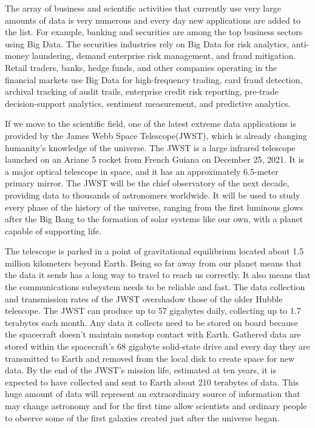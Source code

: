 The array of business and scientific activities that currently use very large amounts of data is very numerous and every day new applications are added to the list. For example, banking and securities are among the top business sectors using Big Data. The securities industries rely on Big Data for risk analytics, anti-money laundering, demand enterprise risk management, and fraud mitigation. Retail traders, banks, hedge funds, and other companies operating in the financial markets use Big Data for high-frequency trading, card fraud detection, archival tracking of audit trails, enterprise credit risk reporting, pre-trade decision-support analytics, sentiment measurement, and predictive analytics.

If we move to the scientific field, one of the latest extreme data applications is provided by the James Webb Space Telescope(JWST), which is already changing humanity's knowledge of the universe. The JWST is a large infrared telescope launched on an Ariane 5 rocket from French Guiana on December 25, 2021. It is a major optical telescope in space, and it has an approximately 6.5-meter primary mirror. The JWST will be the chief observatory of the next decade, providing data to thousands of astronomers worldwide. It will be used to study every phase of the history of the universe, ranging from the first luminous glows after the Big Bang to the formation of solar systems like our own, with a planet capable of supporting life.

The telescope is parked in a point of gravitational equilibrium located about 1.5 million kilometers beyond Earth. Being so far away from our planet means that the data it sends has a long way to travel to reach us correctly. It also means that the communications subsystem needs to be reliable and fast. The data collection and transmission rates of the JWST overshadow those of the older Hubble telescope. The JWST can produce up to 57 gigabytes daily, collecting up to 1.7 terabytes each month. Any data it collects need to be stored on board because the spacecraft doesn't maintain nonstop contact with Earth. Gathered data are stored within the spacecraft's 68 gigabyte solid-state drive and every day they are transmitted to Earth and removed from the local disk to create space for new data. By the end of the JWST's mission life, estimated at ten years, it is expected to have collected and sent to Earth about 210 terabytes of data. This huge amount of data will represent an extraordinary source of information that may change astronomy and for the first time allow scientists and ordinary people to observe some of the first galaxies created just after the universe began.


